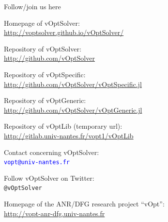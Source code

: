 \documentclass[10pt,xcolor=dvipsnames]{beamer}
\newcommand{\blue}{\textcolor{blue}}
\begin{document}
\begin{frame}{Follow/join us here}



\small{

Homepage of vOptSolver:\vspace{-1mm} \\
         \blue{\url{http://voptsolver.github.io/vOptSolver/}}


\quad Repository of vOptSolver:\vspace{-1mm}\\
\quad         \url{http://github.com/vOptSolver}
         
\quad Repository of vOptSpecific:\vspace{-1mm}\\
\quad         \url{http://github.com/vOptSolver/vOptSpecific.jl}

\quad Repository of vOptGeneric:\vspace{-1mm}\\
\quad         \url{http://github.com/vOptSolver/vOptGeneric.jl}              

\quad Repository of vOptLib (temporary url):\vspace{-1mm}\\
\quad         \url{http://gitlab.univ-nantes.fr/vopt1/vOptLib}              

\vspace{2mm}




Contact concerning vOptSolver:\vspace{-1mm}\\
         \blue{\texttt{vopt@univ-nantes.fr}}  \\
\vspace{2mm}


Follow vOptSolver on Twitter:\vspace{-1mm}\\
   \texttt{@vOptSolver}  \\
\vspace{2mm}

Homepage of the ANR/DFG research project ``vOpt'': \vspace{-1mm}\\
         \url{http://vopt-anr-dfg.univ-nantes.fr}


}

\end{frame}
\end{document}
